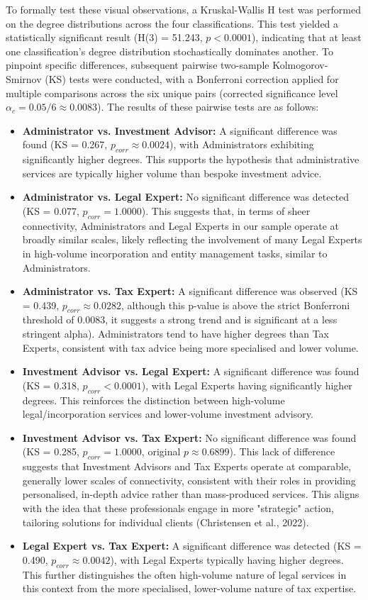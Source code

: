 To formally test these visual observations, a Kruskal-Wallis H test was performed on the degree distributions across the four classifications. This test yielded a statistically significant result (H(3) = 51.243, $p < 0.0001$), indicating that at least one classification's degree distribution stochastically dominates another. To pinpoint specific differences, subsequent pairwise two-sample Kolmogorov-Smirnov (KS) tests were conducted, with a Bonferroni correction applied for multiple comparisons across the six unique pairs (corrected significance level $\alpha_c = 0.05/6 \approx 0.0083$). The results of these pairwise tests are as follows:
\begin{itemize}
    \item \textbf{Administrator vs. Investment Advisor:} A significant difference was found (KS = 0.267, $p_{corr} \approx 0.0024$), with Administrators exhibiting significantly higher degrees. This supports the hypothesis that administrative services are typically higher volume than bespoke investment advice.
    \item \textbf{Administrator vs. Legal Expert:} No significant difference was detected (KS = 0.077, $p_{corr} = 1.0000$). This suggests that, in terms of sheer connectivity, Administrators and Legal Experts in our sample operate at broadly similar scales, likely reflecting the involvement of many Legal Experts in high-volume incorporation and entity management tasks, similar to Administrators.
    \item \textbf{Administrator vs. Tax Expert:} A significant difference was observed (KS = 0.439, $p_{corr} \approx 0.0282$, although this p-value is above the strict Bonferroni threshold of 0.0083, it suggests a strong trend and is significant at a less stringent alpha). Administrators tend to have higher degrees than Tax Experts, consistent with tax advice being more specialised and lower volume.
    \item \textbf{Investment Advisor vs. Legal Expert:} A significant difference was found (KS = 0.318, $p_{corr} < 0.0001$), with Legal Experts having significantly higher degrees. This reinforces the distinction between high-volume legal/incorporation services and lower-volume investment advisory.
    \item \textbf{Investment Advisor vs. Tax Expert:} No significant difference was found (KS = 0.285, $p_{corr} = 1.0000$, original $p \approx 0.6899$). This lack of difference suggests that Investment Advisors and Tax Experts operate at comparable, generally lower scales of connectivity, consistent with their roles in providing personalised, in-depth advice rather than mass-produced services. This aligns with the idea that these professionals engage in more "strategic" action, tailoring solutions for individual clients (Christensen et al., 2022).
    \item \textbf{Legal Expert vs. Tax Expert:} A significant difference was detected (KS = 0.490, $p_{corr} \approx 0.0042$), with Legal Experts typically having higher degrees. This further distinguishes the often high-volume nature of legal services in this context from the more specialised, lower-volume nature of tax expertise.
\end{itemize}
